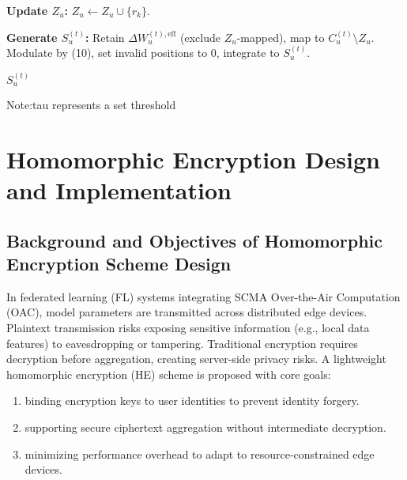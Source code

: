 \documentclass[runningheads]{llncs}
\begin{document}
\begin{enumerate}
\begin{algorithm}[h]
\begin{algorithmic}[1]
\State \textbf{Update \( Z_u \):}
        \State \( Z_u \leftarrow Z_u \cup \{r_k\} \).
    \EndIf
\EndFor

\State \textbf{Generate \( S_u^{(t)} \):}
\State Retain \( \Delta W_u^{(t), \text{eff}} \) (exclude \( Z_u \)-mapped), map to \( C_u^{(t)} \setminus Z_u \).
\State Modulate by (10), set invalid positions to 0, integrate to \( S_u^{(t)} \).

\Return \( S_u^{(t)} \)
\end{algorithmic}
\end{algorithm}

\footnotesize{Note:tau represents a set threshold}
\end{enumerate}
\section{Homomorphic Encryption Design and Implementation}
\subsection{Background and Objectives of Homomorphic Encryption Scheme Design}
In federated learning (FL) systems integrating SCMA Over-the-Air Computation (OAC), model parameters are transmitted across distributed edge devices. Plaintext transmission risks exposing sensitive information (e.g., local data features) to eavesdropping or tampering. Traditional encryption requires decryption before aggregation, creating server-side privacy risks. A lightweight homomorphic encryption (HE) scheme is proposed with core goals:
 \begin{enumerate}
 \item binding encryption keys to user identities to prevent identity forgery.
 \item supporting secure ciphertext aggregation without intermediate decryption.
 \item minimizing performance overhead to adapt to resource-constrained edge devices.
 \end{enumerate}
\end{document}
